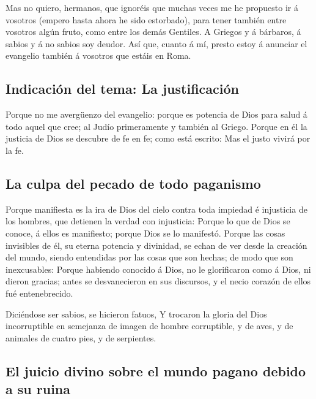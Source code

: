  Mas no quiero, hermanos, que ignoréis que muchas veces me
he propuesto ir á vosotros (empero hasta ahora he sido estorbado), para
tener también entre vosotros algún fruto, como entre los demás Gentiles.
 A Griegos y á bárbaros, á sabios y á no sabios soy deudor.
 Así que, cuanto á mí, presto estoy á anunciar el evangelio
también á vosotros que estáis en Roma.

\hypertarget{indicaciuxf3n-del-tema-la-justificaciuxf3n}{%
\subsection{Indicación del tema: La
justificación}\label{indicaciuxf3n-del-tema-la-justificaciuxf3n}}

 Porque no me avergüenzo del evangelio: porque es potencia
de Dios para salud á todo aquel que cree; al Judío primeramente y
también al Griego.  Porque en él la justicia de Dios se
descubre de fe en fe; como está escrito: Mas el justo vivirá por la fe.

\hypertarget{la-culpa-del-pecado-de-todo-paganismo}{%
\subsection{La culpa del pecado de todo
paganismo}\label{la-culpa-del-pecado-de-todo-paganismo}}

 Porque manifiesta es la ira de Dios del cielo contra toda
impiedad é injusticia de los hombres, que detienen la verdad con
injusticia:  Porque lo que de Dios se conoce, á ellos es
manifiesto; porque Dios se lo manifestó.  Porque las cosas
invisibles de él, su eterna potencia y divinidad, se echan de ver desde
la creación del mundo, siendo entendidas por las cosas que son hechas;
de modo que son inexcusables:  Porque habiendo conocido á
Dios, no le glorificaron como á Dios, ni dieron gracias; antes se
desvanecieron en sus discursos, y el necio corazón de ellos fué
entenebrecido.

 Diciéndose ser sabios, se hicieron fatuos,  Y
trocaron la gloria del Dios incorruptible en semejanza de imagen de
hombre corruptible, y de aves, y de animales de cuatro pies, y de
serpientes.

\hypertarget{el-juicio-divino-sobre-el-mundo-pagano-debido-a-su-ruina}{%
\subsection{El juicio divino sobre el mundo pagano debido a su
ruina}\label{el-juicio-divino-sobre-el-mundo-pagano-debido-a-su-ruina}}

